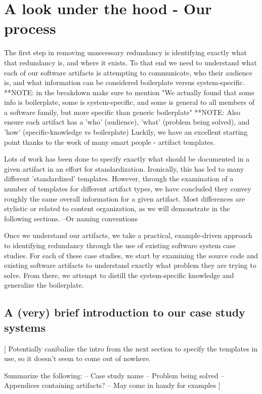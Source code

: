 \chapter{A look under the hood - Our process}

The first step in removing unnecessary redundancy is identifying exactly what
that redundancy is, and where it exists. To that end we need to understand what
each of our software artifacts is attempting to communicate, who their audience
is, and what information can be considered boilerplate versus system-specific.
  **NOTE: in the breakdown make sure to mention "We actually found that some
  info is boilerplate, some is system-specific, and some is general to all
  members of a software family, but more specific than generic boilerplate"
  **NOTE: Also ensure each artifact has a 'who' (audience), 'what' (problem
  being solved), and 'how' (specific-knowledge vs boilerplate)
Luckily, we have an excellent starting point thanks to the work of many smart
people - artifact templates.

Lots of work has been done to specify exactly what should be documented in a
given artifact in an effort for standardization. Ironically, this has led to
many different 'standardized' templates. However, through the examination of a
number of templates for different artifact types, we have concluded they convey
roughly the same overall information for a given artifact. Most differences are
stylistic or related to content organization, as we will demonstrate in the 
following sections.
  --Or naming conventions

Once we understand our artifacts, we take a practical, example-driven approach
to identifying redundancy through the use of existing software system case
studies. For each of these case studies, we start by examining the source code
and existing software artifacts to understand exactly what problem they are
trying to solve. From there, we attempt to distill the system-specific knowledge
and generalize the boilerplate.

\section{A (very) brief introduction to our case study systems}
  
  [ Potentially canibalize the intro from the next section to specify the
    templates in use, so it doesn't seem to come out of nowhere.
    
    Summarize the following:
      -- Case study name
      -- Problem being solved
      -- Appendices containing artifacts? -- May come in handy for examples
  ]
  
